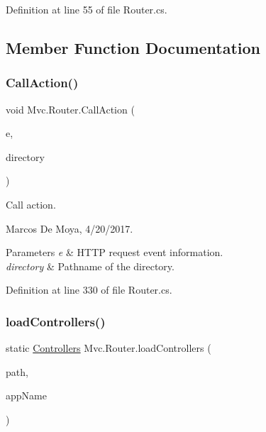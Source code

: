Definition at line 55 of file Router.\+cs.



\subsection{Member Function Documentation}
\mbox{\label{class_mvc_1_1_router_a4fd8fe9a8853330f74267b4a56bcb4a4}} 
\subsubsection{\texorpdfstring{Call\+Action()}{CallAction()}}
{\footnotesize\ttfamily void Mvc.\+Router.\+Call\+Action (\begin{DoxyParamCaption}\item[{\hyperlink{class_p_http_1_1_http_request_event_args}{Http\+Request\+Event\+Args}}]{e,  }\item[{string}]{directory }\end{DoxyParamCaption})}



Call action. 

Marcos De Moya, 4/20/2017. 


\begin{DoxyParams}{Parameters}
{\em e} & H\+T\+TP request event information. \\
\hline
{\em directory} & Pathname of the directory. \\
\hline
\end{DoxyParams}


Definition at line 330 of file Router.\+cs.

\mbox{\label{class_mvc_1_1_router_aab057f45a02f85a3b6ceaff85a1edf6e}} 
\subsubsection{\texorpdfstring{load\+Controllers()}{loadControllers()}}
{\footnotesize\ttfamily static \hyperlink{class_mvc_1_1_router_1_1_controllers}{Controllers} Mvc.\+Router.\+load\+Controllers (\begin{DoxyParamCaption}\item[{string}]{path,  }\item[{string}]{app\+Name }\end{DoxyParamCaption})\hspace{0.3cm}{\ttfamily [static]}}



